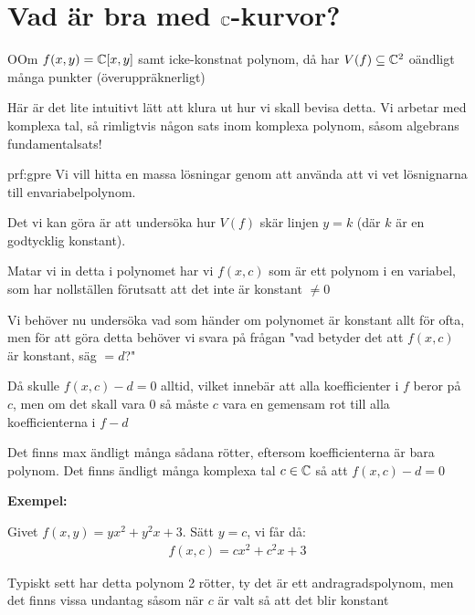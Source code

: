 \section{Vad är bra med $\mathbb{C}$-kurvor?}\par
\begin{theo}
  OOm $f(x,y) = \mathbb{C}[x,y]$ samt icke-konstnat polynom, då har $V(f)\subseteq\mathbb{C}^2$ oändligt många punkter (överuppräknerligt) 
\end{theo}
\par\bigskip
\noindent Här är det lite intuitivt lätt att klura ut hur vi skall bevisa detta. Vi arbetar med komplexa tal, så rimligtvis någon sats inom komplexa polynom, såsom algebrans fundamentalsats!
\par\bigskip
\begin{prf}{prf:gpre}
  Vi vill hitta en massa lösningar genom att använda att vi vet lösnignarna till envariabelpolynom.\par
  \noindent Det vi kan göra är att undersöka hur $V(f)$ skär linjen $y=k$ (där $k$ är en godtycklig konstant).\par
  \noindent Matar vi in detta i polynomet har vi $f(x,c)$ som är ett polynom i en variabel, som har nollställen förutsatt att det inte är konstant $\neq0$
  \par\bigskip
  \noindent Vi behöver nu undersöka vad som händer om polynomet är konstant allt för ofta, men för att göra detta behöver vi svara på frågan "vad betyder det att $f(x,c)$ är konstant, säg $=d$?"\par
  \noindent Då skulle $f(x,c)-d=0$ alltid, vilket innebär att alla koefficienter i $f$ beror på $c$, men om det skall vara 0 så måste $c$ vara en gemensam rot till alla koefficienterna i $f-d$\par\bigskip
  \noindent Det finns max ändligt många sådana rötter, eftersom koefficienterna är bara polynom. Det finns ändligt många komplexa tal $c\in\mathbb{C}$ så att $f(x,c)-d=0$ 
\end{prf}
\par\bigskip
\noindent\textbf{Exempel:}\par
\noindent Givet $f(x,y) = yx^2+y^2x+3$. Sätt $y=c$, vi får då:
\begin{equation*}
  \begin{gathered}
    f(x,c) = cx^2+c^2x+3
  \end{gathered}
\end{equation*}\par
\noindent Typiskt sett har detta polynom 2 rötter, ty det är ett andragradspolynom, men det finns vissa undantag såsom när $c$ är valt så att det blir konstant\par
